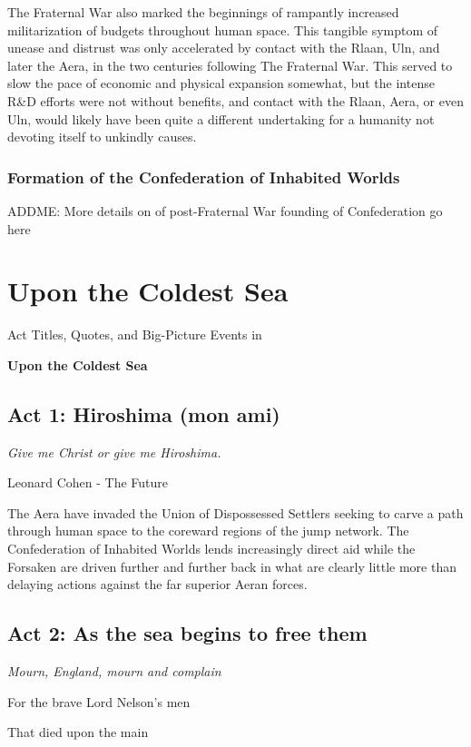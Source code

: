 The Fraternal War also marked the beginnings of rampantly increased
militarization of budgets throughout human space. This tangible
symptom of unease and distrust was only accelerated by contact with
the Rlaan, Uln, and later the Aera, in the two centuries following The
Fraternal War. This served to slow the pace of economic and physical
expansion somewhat, but the intense R\&D efforts were not without
benefits, and contact with the Rlaan, Aera, or even Uln, would likely
have been quite a different undertaking for a humanity not devoting
itself to unkindly causes.

\subsubsection{Formation of the Confederation of Inhabited Worlds}
ADDME: More details on of post-Fraternal War founding of Confederation go here

\section{Upon the Coldest Sea}
\label{exptimeline:UtCS}
Act Titles, Quotes, and Big-Picture Events in

{\bf Upon the Coldest Sea }

\subsection{Act 1: Hiroshima (mon ami)}
\begin{center}
{\it Give me Christ or give me Hiroshima.}

Leonard Cohen - The Future
\end{center}

The Aera have invaded the Union of Dispossessed Settlers seeking to
carve a path through human space to the coreward regions of the jump
network. The Confederation of Inhabited Worlds lends increasingly
direct aid while the Forsaken are driven further and further back in
what are clearly little more than delaying actions against the far
superior Aeran forces.

\subsection{Act 2: As the sea begins to free them}

\begin{center}
{\it Mourn, England, mourn and complain

For the brave Lord Nelson's men

That died upon the main}
\end{center}


